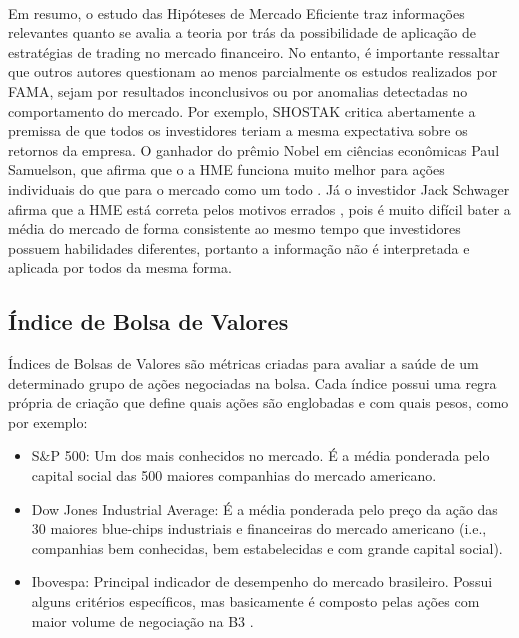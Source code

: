 \paragraph{} Em resumo, o estudo das Hipóteses de Mercado Eficiente traz informações relevantes quanto se avalia a teoria por trás da possibilidade de aplicação de estratégias de trading no mercado financeiro. No entanto, é importante ressaltar que outros autores questionam ao menos parcialmente os estudos realizados por FAMA, sejam por resultados inconclusivos ou por anomalias detectadas no comportamento do mercado. Por exemplo, SHOSTAK \cite{shostak1997defense} critica abertamente a premissa de que todos os investidores teriam a mesma expectativa sobre os retornos da empresa. O ganhador do prêmio Nobel em ciências econômicas Paul Samuelson, que afirma que o a HME funciona muito melhor para ações individuais do que para o mercado como um todo \cite{jung2005samuelson}. Já o investidor Jack Schwager afirma que a HME está correta pelos motivos errados \cite{schwager2012market}, pois é muito difícil bater a média do mercado de forma consistente ao mesmo tempo que investidores possuem habilidades diferentes, portanto a informação não é interpretada e aplicada por todos da mesma forma.


\subsection{Índice de Bolsa de Valores}

Índices de Bolsas de Valores \cite{stock_index} são métricas criadas para avaliar a saúde de um determinado grupo de ações negociadas na bolsa. Cada índice possui uma regra própria de criação que define quais ações são englobadas e com quais pesos, como por exemplo:

\begin{itemize}
    \item S\&P 500: Um dos mais conhecidos no mercado. É a média ponderada pelo capital social das 500 maiores companhias do mercado americano.
    \item Dow Jones Industrial Average: É a média ponderada pelo preço da ação das 30 maiores blue-chips industriais e financeiras do mercado americano (i.e., companhias bem conhecidas, bem estabelecidas e com grande capital social).
    \item Ibovespa: Principal indicador de desempenho do mercado brasileiro. Possui alguns critérios específicos, mas basicamente é composto pelas ações com maior volume de negociação na B3 \cite{ibovespa}.
\end{itemize}

